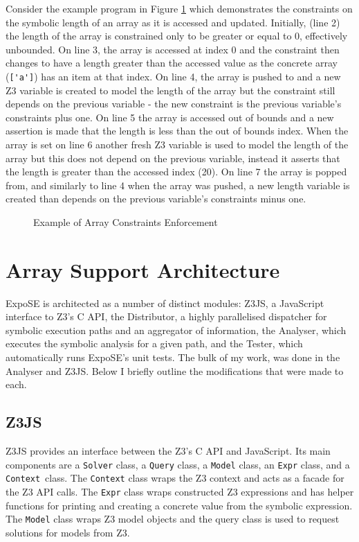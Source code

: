 \documentclass[]{final_report}
\begin{document}
Consider the example program in Figure \ref{fig:expose-array-length} which demonstrates the constraints on the symbolic length of an array as it is accessed and updated. Initially, (line 2) the length of the array is constrained only to be greater or equal to 0, effectively unbounded. On line 3, the array is accessed at index 0 and the constraint then changes to have a length greater than the accessed value as the concrete array (\lstinline|['a']|) has an item at that index. On line 4, the array is pushed to and a new Z3 variable is created to model the length of the array but the constraint still depends on the previous variable - the new constraint is the previous variable's constraints plus one. On line 5 the array is accessed out of bounds and a new assertion is made that the length is less than the out of bounds index. When the array is set on line 6 another fresh Z3 variable is used to model the length of the array but this does not depend on the previous variable, instead it asserts that the length is greater than the accessed index (20). On line 7 the array is popped from, and similarly to line 4 when the array was pushed, a new length variable is created than depends on the previous variable's constraints minus one.

\begin{figure}[t]

\caption{\label{fig:expose-array-length} Example of Array Constraints Enforcement}
\end{figure}

\section{Array Support Architecture}
ExpoSE is architected as a number of distinct modules: Z3JS, a JavaScript interface to Z3’s C API, the Distributor, a highly parallelised dispatcher for symbolic execution paths and an aggregator of information, the Analyser, which executes the symbolic analysis for a given path, and the Tester, which automatically runs ExpoSE’s unit tests. The bulk of my work, was done in the Analyser and Z3JS. Below I briefly outline the modifications that were made to each.

\subsection{Z3JS}
Z3JS provides an interface between the Z3’s C API and JavaScript. Its main components are a \lstinline|Solver| class, a \lstinline|Query| class, a \lstinline|Model| class, an \lstinline|Expr| class, and a \lstinline|Context|~class. The \lstinline|Context| class wraps the Z3 context and acts as a facade for the Z3 API calls. The \lstinline|Expr| class wraps constructed Z3 expressions and has helper functions for printing and creating a concrete value from the symbolic expression. The \lstinline|Model| class wraps Z3 model objects and the query class is used to request solutions for models from Z3.
\end{document}
